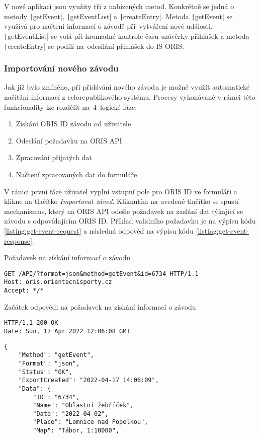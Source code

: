 V nové aplikaci jsou využity tři z nabízených metod. Konkrétně se jedná o metody \texttt|getEvent|, \texttt|getEventList| a \texttt|createEntry|. Metoda \texttt|getEvent| se využívá pro načtení informací o závodě při~vytváření nové události, \texttt|getEventList| se volá při hromadné kontrole času uzávěrky přihlášek a metoda \texttt|createEntry| se podílí na~odesílání přihlášek do IS ORIS.

\subsubsection{Importování nového závodu}
Jak již bylo zmíněno, při přidávání nového závodu je možné využít automatické načítání informací z celorepublikového systému. Procesy vykonávané v rámci této funkcionality lze rozdělit na~4~logické fáze:
\begin{enumerate}
    \item Získání ORIS ID závodu od uživatele
    \item Odeslání požadavku na ORIS API
    \item Zpracování přijatých dat
    \item Načtení zpracovaných dat do formuláře
\end{enumerate}

V rámci první fáze uživatel vyplní vstupní pole pro ORIS ID ve formuláři a klikne na tlačítko \emph{Importovat závod}. Kliknutím na uvedené tlačítko se spustí mechanismus, který na ORIS API odešle požadavek na zaslání dat týkající se závodu s odpovídajícím ORIS ID. Příklad validního požadavku je na výpisu kódu \ref{listing:get-event-request} a následná odpověď na výpisu kódu \ref{listing:get-event-response}.

\begin{listing}[h]
    \caption{Požadavek na získání informací o závodu}\label{listing:get-event-request}
    \begin{verbatim}
GET /API/?format=json&method=getEvent&id=6734 HTTP/1.1
Host: oris.orientacnisporty.cz
Accept: */*
    \end{verbatim}
\end{listing}
\vspace{-3mm}

\begin{listing}[h]
    \caption{Začátek odpovědi na požadavek na získání informací o závodu}\label{listing:get-event-response}
    \begin{verbatim}
HTTP/1.1 200 OK
Date: Sun, 17 Apr 2022 12:06:08 GMT

    \end{verbatim}
    \vspace{-11mm}
    \begin{verbatim}
{
    "Method": "getEvent",
    "Format": "json",
    "Status": "OK",
    "ExportCreated": "2022-04-17 14:06:09",
    "Data": {
        "ID": "6734",
        "Name": "Oblastní žebříček",
        "Date": "2022-04-02",
        "Place": "Lomnice nad Popelkou",
        "Map": "Tábor, 1:10000",
    \end{verbatim}
\end{listing}

